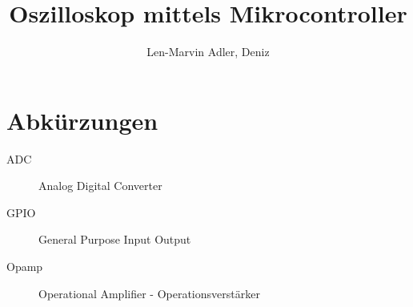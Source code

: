 \documentclass[]{article}
\title{Oszilloskop mittels Mikrocontroller}
\author{Len-Marvin Adler, Deniz}
\begin{document}
\maketitle
\clearpage
\tableofcontents
\clearpage

\section*{Abkürzungen}
\begin{description}
	\item[ADC]
	Analog Digital Converter
	
	\item[GPIO]
	General Purpose Input Output
	
	\item[Opamp]
	Operational Amplifier - Operationsverstärker
\end{description}
\clearpage




















\end{document}
